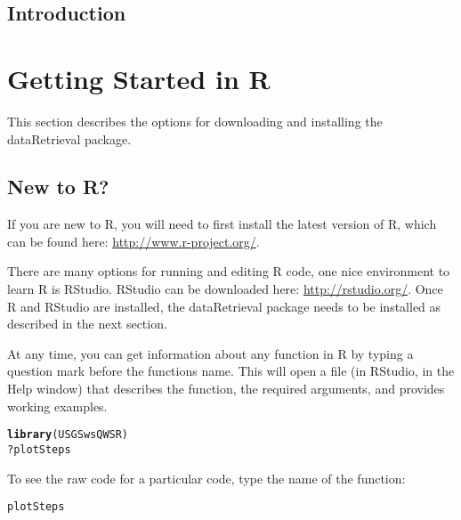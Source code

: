 \documentclass[a4paper,11pt]{article}\usepackage{graphicx, color}
\makeatletter
\newcommand{\hlfunctioncall}[1]{\textcolor[rgb]{0.501960784313725,0,0.329411764705882}{\textbf{#1}}}%
\newenvironment{kframe}{%
 \def\at@end@of@kframe{}%
 \ifinner\ifhmode%
  \def\at@end@of@kframe{\end{minipage}}%
  \begin{minipage}{\columnwidth}%
 \fi\fi%
 \def\FrameCommand##1{\hskip\@totalleftmargin \hskip-\fboxsep
 \colorbox{shadecolor}{##1}\hskip-\fboxsep
     \hskip-\linewidth \hskip-\@totalleftmargin \hskip\columnwidth}%
 \MakeFramed {\advance\hsize-\width
   \@totalleftmargin\z@ \linewidth\hsize
   \@setminipage}}%
 {\par\unskip\endMakeFramed%
 \at@end@of@kframe}
\newenvironment{knitrout}{}{} %
\makeatother
\begin{document}
\subsection{Introduction}


\clearpage
\appendix

\section{Getting Started in R}
\label{sec:appendix1}
This section describes the options for downloading and installing the dataRetrieval package.

\subsection{New to R?}
If you are new to R, you will need to first install the latest version of R, which can be found here: \url{http://www.r-project.org/}.

There are many options for running and editing R code, one nice environment to learn R is RStudio. RStudio can be downloaded here: \url{http://rstudio.org/}. Once R and RStudio are installed, the dataRetrieval package needs to be installed as described in the next section.

At any time, you can get information about any function in R by typing a question mark before the functions name.  This will open a file (in RStudio, in the Help window) that describes the function, the required arguments, and provides working examples.

\begin{knitrout}
\color{fgcolor}\begin{kframe}
\begin{alltt}
\hlfunctioncall{library}(USGSwsQWSR)
?plotSteps
\end{alltt}
\end{kframe}
\end{knitrout}


To see the raw code for a particular code, type the name of the function:
\begin{knitrout}
\color{fgcolor}\begin{kframe}
\begin{alltt}
plotSteps
\end{alltt}
\end{kframe}
\end{knitrout}
\end{document}
